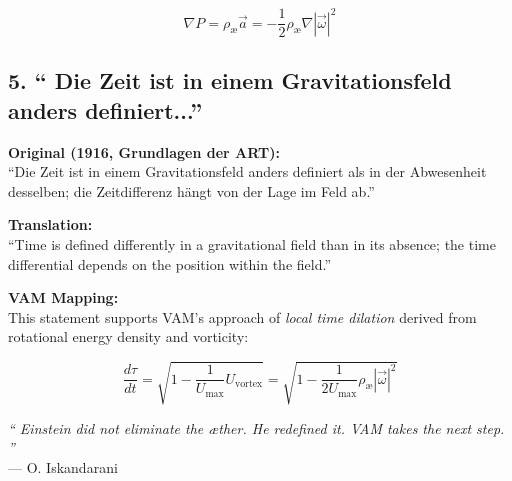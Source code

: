 \[
\nabla P = \rho_\text{\ae} \vec{a} = -\frac{1}{2} \rho_\text{\ae} \nabla |\vec{\omega}|^2
\]

\subsection*{5. `` Die Zeit ist in einem Gravitationsfeld anders definiert...''}
\textbf{Original (1916, Grundlagen der ART):} \\
``Die Zeit ist in einem Gravitationsfeld anders definiert als in der Abwesenheit desselben; die Zeitdifferenz hängt von der Lage im Feld ab.''

\textbf{Translation:} \\
``Time is defined differently in a gravitational field than in its absence; the time differential depends on the position within the field.''

\textbf{VAM Mapping:} \\
This statement supports VAM's approach of \emph{local time dilation} derived from rotational energy density and vorticity:

\[
\frac{d\tau}{dt} = \sqrt{1 - \frac{1}{U_\text{max}} U_{\text{vortex}}} = \sqrt{1 - \frac{1}{2U_\text{max}} \rho_\text{\ae} |\vec{\omega}|^2}
\]

\bigskip
\textit{ `` Einstein did not eliminate the æther. He redefined it. VAM takes the next step. ''}\\
\hfill — O. Iskandarani\\